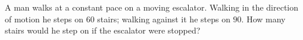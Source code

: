 A man walks at a constant pace on a moving escalator. Walking in the direction of motion he steps on $60$ stairs; walking against it he steps on $90$. How many stairs would he step on if the escalator were stopped?
